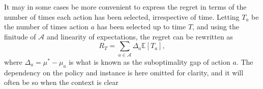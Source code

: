It may in some cases be more convenient to express the regret in terms of the number of times each action has been selected, irrespective of time.
Letting $T_a$ be the number of times action $a$ has been selected up to time $T$, and using the finitude of $\mathcal{A}$ and linearity of expectations, the regret can be rewritten as
\begin{equation}
    R_T = \sum_{a \in \mathcal{A}} \Delta_a  \mathbb{E}[T_a],
    \label{eq:regret2}
\end{equation}
where $\Delta_a = \mu^* - \mu_a$ is what is known as the suboptimality gap of action $a$.
The dependency on the policy and instance is here omitted for clarity, and it will often be so when the context is clear
